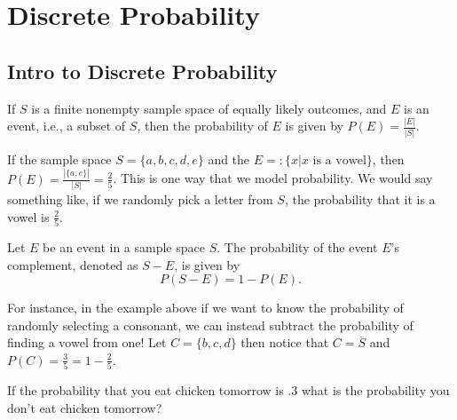 \section{Discrete Probability}
\subsection{Intro to Discrete Probability}
\begin{defn}
    If $S$ is a finite nonempty sample space of equally likely outcomes, and $E$ is an event, i.e., a subset of $S$, then the probability of $E$ is given by $P(E) = \frac{|E|}{|S|}$.
\end{defn}

\begin{exmp}
If the sample space $S=\{a,b,c,d,e\}$ and the $E=:\{x| x \text{ is a vowel}\}$, then $P(E)=\frac{|\{a,e\}|}{|S|}=\frac{2}{5}$. 
\newline
This is one way that we model probability. We would say something like, if we randomly pick a letter from $S$, the probability that it is a vowel is $\frac{2}{5}$.
\newline

\end{exmp}

\begin{exmp}
    Let $E$ be an event in a sample space $S$. The probability of the event $E$'s complement, denoted as $S - E$, is given by
    \[
    P(S-E) = 1 - P(E).
    \]
\end{exmp}
\begin{exmp}
For instance, in the example above if we want to know the probability of randomly selecting a consonant, we can instead subtract the probability of finding a vowel from one!
\newline
Let $C=\{b,c,d\}$ then notice that $C=\overline{S}$ and $P(C)=\frac{3}{5}=1-\frac{2}{5}$.
\newline
\end{exmp}
\begin{exmp}
If the probability that you eat chicken tomorrow is $.3$ what is the probability you don't eat chicken tomorrow?
\vspace{2cm}
\end{exmp}


